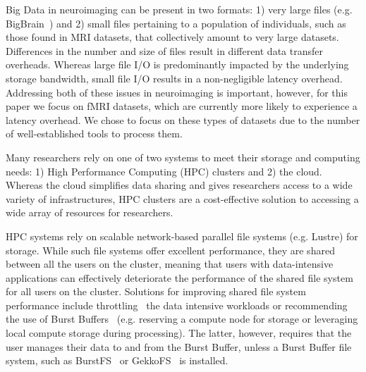     Big Data in neuroimaging can be present in two formats: 1) very large files
    (e.g. BigBrain~\cite{amunts2013bigbrain}) and 2) small files pertaining to a
    population of individuals, such as those found in MRI datasets, that
    collectively amount to very large datasets. Differences in the number and
    size of files result in different data transfer overheads. Whereas large
    file I/O is predominantly impacted by the underlying storage bandwidth,
    small file I/O results in a non-negligible latency overhead. Addressing both
    of these issues in neuroimaging is important, however, for this paper we
    focus on fMRI datasets, which are currently more likely to experience a
    latency overhead. We chose to focus on these types of datasets due to the
    number of well-established tools to process them.

    
    
    
    Many researchers rely on one of two systems to meet their storage and
    computing needs: 1) High Performance Computing (HPC) clusters and 2) the
    cloud. Whereas the cloud simplifies data sharing and gives researchers
    access to a wide variety of infrastructures, HPC clusters are a
    cost-effective solution to accessing a wide array of resources for
    researchers. %
    
    HPC systems rely on scalable network-based parallel file systems (e.g.
    Lustre) for storage. While such file systems offer excellent performance,
    they are shared between all the users on the cluster, meaning that users
    with data-intensive applications can effectively deteriorate the performance
    of the shared file system for all users on the cluster. Solutions for
    improving shared file system performance include
    throttling~\cite{huang2020ooops} the data intensive workloads or
    recommending the use of Burst Buffers~\cite{bb} (e.g. reserving a compute
    node for storage or leveraging local compute storage during processing). The
    latter, however, requires that the user manages their data to and from the
    Burst Buffer, unless a Burst Buffer file system, such as
    BurstFS~\cite{burstfs} or GekkoFS~\cite{gekkofs} is installed.
    

